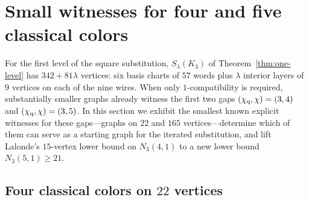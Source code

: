 \section{Small witnesses for four and five classical colors}\label{sec:finite}

For the first level of the square substitution, $S_\lambda(K_3)$ of Theorem~\ref{thm:one-level} has $342+81\lambda$ vertices: six basis charts of $57$ words plus $\lambda$ interior layers of $9$ vertices on each of the nine wires. When only $1$-compatibility is required, substantially smaller graphs already witness the first two gaps $(\chi_{\mathrm q},\chi)=(3,4)$ and $(\chi_{\mathrm q},\chi)=(3,5)$. In this section we exhibit the smallest known explicit witnesses for these gaps---graphs on $22$ and $165$ vertices---determine which of them can serve as a starting graph for the iterated substitution, and lift Lalonde's $15$-vertex lower bound on $N_3(4,1)$ to a new lower bound $N_3(5,1)\ge21$.

\subsection{Four classical colors on \texorpdfstring{$22$}{22} vertices}\label{sec:f22}

